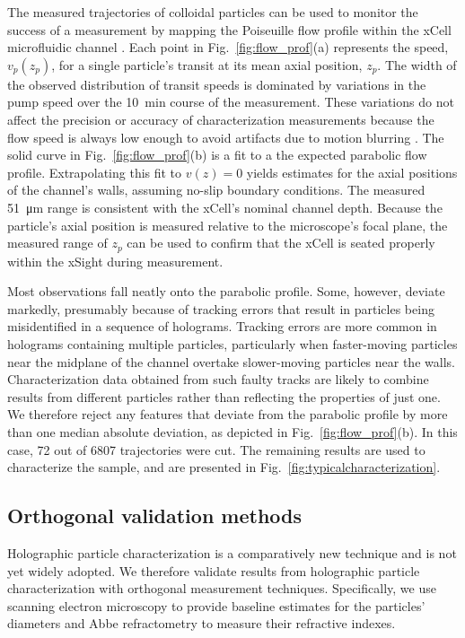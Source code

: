 \documentclass[journal=langd5,manuscript=article]{achemso}
\begin{document}
The measured trajectories of colloidal particles 
can be used to monitor
the success of a measurement by mapping the
Poiseuille flow profile within the xCell microfluidic
channel \cite{cheong2009flow,cheong10a}.
Each point in Fig.~\ref{fig:flow_prof}(a)
represents the speed, $v_p(z_p)$, for a single
particle's transit at its mean axial position, $z_p$.
The width of the observed distribution of transit speeds
is dominated by variations in the pump speed over
the \SI{10}{\minute} course of the measurement.
These variations do not affect the precision or accuracy
of characterization measurements because 
the flow speed is always low enough to avoid artifacts
due to motion blurring \cite{cheong2009flow,dixon2011holographic}.
The solid curve in Fig.~\ref{fig:flow_prof}(b) is a fit to a
the expected parabolic flow profile. 
Extrapolating this fit to $v(z) = 0$ yields estimates
for the axial positions of the channel's walls, assuming
no-slip boundary conditions.
The measured \SI{51}{\um} range is consistent with
the xCell's nominal channel depth.
Because the particle's axial position is measured
relative to the microscope's focal plane,
the measured range of $z_p$
can be used to confirm that the xCell is seated
properly within the xSight during measurement.

Most observations fall neatly onto the parabolic profile.
Some, however, deviate markedly, presumably because
of tracking errors that result in particles being
misidentified in a sequence of holograms.
Tracking errors are more common in holograms
containing multiple particles, particularly when
faster-moving particles near the midplane of the
channel overtake slower-moving particles near
the walls.
Characterization data obtained from such faulty tracks
are likely to combine results from different particles
rather than reflecting the properties of just one.
We therefore reject any features that deviate from
the parabolic profile by more than one median absolute deviation,
as depicted in Fig.~\ref{fig:flow_prof}(b).
In this case, \num{72} out of \num{6807} trajectories
were cut.
The remaining results are used
to characterize the sample, and are presented
in Fig.~\ref{fig:typicalcharacterization}.

\subsection{Orthogonal validation methods}
\label{sec:orthogonalmethods}

Holographic particle characterization is a comparatively new technique
and is not yet widely adopted. We therefore validate results from
holographic particle characterization with 
orthogonal measurement techniques.
Specifically, we use scanning electron microscopy to provide baseline estimates for the
particles' diameters and Abbe refractometry to measure their refractive indexes.
\end{document}

